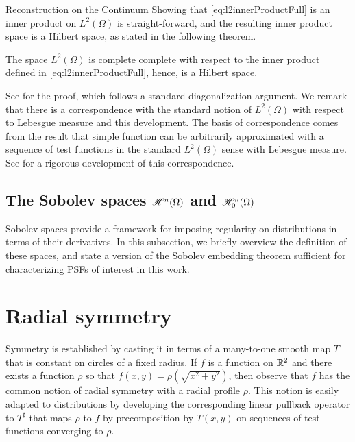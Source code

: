 \begin{chapter}{Reconstruction on the Continuum}
Showing that \eqref{eq:l2innerProductFull} is an inner product on $L^2(\Omega)$ is straight-forward, and the resulting inner product space is a Hilbert space, as stated in the following theorem.
\begin{thm}
The space $L^2(\Omega)$ is complete complete with respect to the inner product defined in \eqref{eq:l2innerProductFull}, hence, is a Hilbert space.
\end{thm}
See \citep{richtmyer1978principles} for the proof, which follows a standard diagonalization argument. %
We remark that there is a correspondence with the standard notion of $L^2(\Omega)$ with respect to Lebesgue measure and this development.
The basis of correspondence comes from the result that simple function can be arbitrarily approximated with a sequence of test functions in the standard $L^2(\Omega)$ sense with Lebesgue measure. 
See \citep{hormander1983} for a rigorous development of this correspondence.
\subsection{The Sobolev spaces $\mathscr H^n(\Omega)$ and $\mathscr H_0^n(\Omega)$}
Sobolev spaces provide a framework for imposing regularity on distributions in terms of their derivatives.
In this subsection, we briefly overview the definition of these spaces, and state a version of the Sobolev embedding theorem sufficient for characterizing PSFs of interest in this work.

\section{Radial symmetry}
Symmetry is established by casting it in terms of a many-to-one smooth map $T$ that is constant on circles of a fixed radius.  
If $f$ is a function on $\mathbb R^2$ and there exists a function $\rho$ so that $f(x,y) = \rho(\sqrt{x^2 + y^2})$, then observe that $f$ has the common notion of radial symmetry with a radial profile $\rho$.
This notion is easily adapted to distributions by developing the corresponding linear pullback operator to $T^\sharp$ that maps $\rho$ to $f$ by precomposition by $T(x,y)$ on sequences of test functions converging to $\rho$.


\end{chapter}
